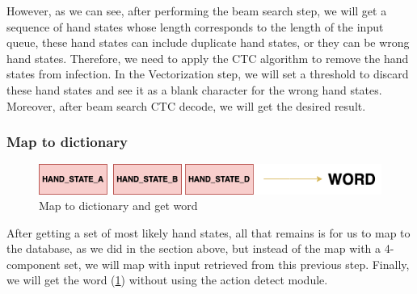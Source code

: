 However, as we can see, after performing the beam search step, we will get a sequence of hand states whose length corresponds to the length of the input queue, these hand states can include duplicate hand states, or they can be wrong hand states. Therefore, we need to apply the CTC algorithm to remove the hand states from infection. In the Vectorization step, we will set a threshold to discard these hand states and see it as a blank character for the wrong hand states. Moreover, after beam search CTC decode, we will get the desired result.



      
      
    \subsubsection{ Map to dictionary }

      \begin{figure}[H]
        \centering
        \includegraphics[width=\textwidth]{img/Chap4/Result.png}
        \caption{ Map to dictionary and get word }
        \label{fig:Chap4-Result}
      \end{figure}

After getting a set of most likely hand states, all that remains is for us to map to the database, as we did in the section above, but instead of the map with a 4-component set, we will map with input retrieved from this previous step. Finally, we will get the word (\ref{fig:Chap4-Result}) without using the action detect module.



